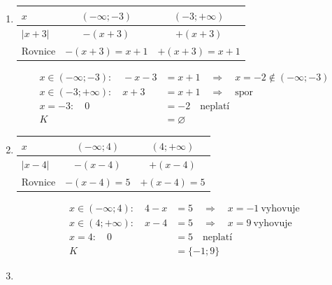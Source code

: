 \documentclass[11pt,a4paper]{article}
\begin{document}
\begin{zadaniReseniBox}[title={Domácí úkol}]
\begin{enumerate}[label=\alph*),itemsep=1pt]
\[\begin{aligned}
x\in (0;+\infty):\quad x &= 7\quad\Longrightarrow\quad x=7\ \text{vyhovuje}\\[2pt]
x=0:\quad 0 &= 7\quad\text{neplatí}\\[2pt]
K&=\{-7;7\}\end{aligned}\]
\item
\begin{center}
\begingroup\footnotesize
\renewcommand{\arraystretch}{1.32}
\begin{tabular}{@{}lcc@{}}
\toprule
$x$ & $(-\infty;-3)$ & $(-3;+\infty)$ \\
\midrule
$|x + 3|$ & $-(x + 3)$ & $+(x + 3)$ \\
\midrule
Rovnice & $-(x + 3)=x + 1$ & $+(x + 3)=x + 1$ \\
\bottomrule
\end{tabular}
\endgroup
\end{center}
\[\begin{aligned}x\in (-\infty;-3):\quad - x - 3 &= x + 1\quad\Longrightarrow\quad x=-2\notin (-\infty;-3)\\[2pt]
x\in (-3;+\infty):\quad x + 3 &= x + 1\quad\Longrightarrow\quad \text{spor}\\[2pt]
x=-3:\quad 0 &= -2\quad\text{neplatí}\\[2pt]
K&=\varnothing\end{aligned}\]
\item
\begin{center}
\begingroup\footnotesize
\renewcommand{\arraystretch}{1.32}
\begin{tabular}{@{}lcc@{}}
\toprule
$x$ & $(-\infty;4)$ & $(4;+\infty)$ \\
\midrule
$|x - 4|$ & $-(x - 4)$ & $+(x - 4)$ \\
\midrule
Rovnice & $-(x - 4)=5$ & $+(x - 4)=5$ \\
\bottomrule
\end{tabular}
\endgroup
\end{center}
\[\begin{aligned}x\in (-\infty;4):\quad 4 - x &= 5\quad\Longrightarrow\quad x=-1\ \text{vyhovuje}\\[2pt]
x\in (4;+\infty):\quad x - 4 &= 5\quad\Longrightarrow\quad x=9\ \text{vyhovuje}\\[2pt]
x=4:\quad 0 &= 5\quad\text{neplatí}\\[2pt]
K&=\{-1;9\}\end{aligned}\]
\item
\begin{center}
\begingroup\footnotesize
\renewcommand{\arraystretch}{1.32}

\end{center}
\end{enumerate}
\end{zadaniReseniBox}
\end{document}
